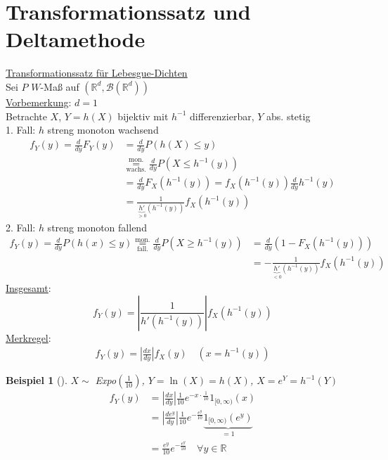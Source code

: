 \documentclass[a4paper,openany]{book}
\theoremstyle{mytheoremstyle}
\newtheorem*{bei}{Beispiel}
\theoremstyle{mytheoremstyle2}
\begin{document}
\section{Transformationssatz und Deltamethode}
\underline{Transformationssatz für Lebesgue-Dichten}\\
Sei $P$ $W$-Maß auf $(\mathbb{R}^d,\mathcal{B}(\mathbb{R}^d))$ \\ 
\underline{Vorbemerkung}: \underline{$d=1$}\\
Betrachte $X$, $Y=h(X)$ bijektiv mit $h ^{-1}$ differenzierbar, $Y$ abs. stetig \\
1. Fall: $h$ streng monoton wachsend 
    \begin{align*}
      f_Y(y)=\frac{d}{dy}F_Y(y)&=\frac{d}{dy}P(h(X)\leq y)\\
                               &\overset{\text{mon.}}{\underset{\text{wachs.}}{=}}\frac{d}{dy} P(X \leq h ^{-1}(y))\\
                               &=\frac{d}{dy}F_X(h ^{-1}(y))=f_X(h ^{-1}(y))\frac{d}{dy}h ^{-1}(y)\\
                               &=\frac{1}{\underbrace{h'}_{>0 \text{}}(h ^{-1}(y))}f_X(h ^{-1}(y))
    \end{align*}
2. Fall: $h$ streng monoton fallend
    \begin{align*}
      f_Y(y)=\frac{d}{dy}P(h(x)\leq y)\overset{\text{mon.}}{\underset{\text{fall.}}{=}}\frac{d}{dy}P(X\geq h ^{-1}(y))&=\frac{d}{dy}(1-F_X(h ^{-1}(y)))\\
                                               &=-\frac{1}{\underbrace{h'}_{<0 \text{}}(h ^{-1}(y))}f_X(h ^{-1}(y))
    \end{align*}
    \underline{Insgesamt}:
    \[
      f_Y(y)=\left|\frac{1}{h'(h ^{-1}(y))}\right|f_X(h ^{-1}(y))
    \]
\underline{Merkregel}: 
\begin{align*}
  f_Y(y)=\left|\frac{dx}{dy}\right|f_X(y) \quad(x=h ^{-1}(y))
\end{align*}
\begin{bei}[]
 $X\sim$ Expo$(\frac{1}{10})$, $Y=\ln\left(X\right)=h(X)$, $X=e^Y=h ^{-1}(Y)$ 
\begin{align*}
  f_Y(y)&=\left|\frac{dx}{dy}\right|\frac{1}{10}e^{-x \cdot \frac{1}{10}}1_{[0,\infty )}(x)\\
        &=\left|\frac{de^y}{dy}\right|\frac{1}{10}e^{-\frac{e^y}{10}}\underbrace{1_{[0,\infty )}(e^y)}_{=1}\\
        &=\frac{e^y}{10}e^{-\frac{e^y}{10}}\quad\forall y \in \mathbb{R}
\end{align*} 
\end{bei}
\end{document}
